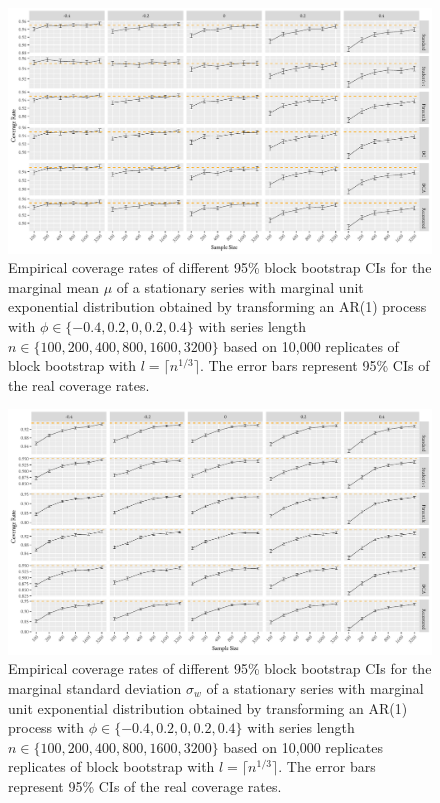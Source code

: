 \documentclass[10pt]{article}
\newcommand{\eds}[1]{\textcolor{red}{EDS: (#1)}}
\newcommand{\mc}[1]{\textcolor{orange}{MC: (#1)}}
\begin{document}
\begin{figure}[tbp]
  \centering
  \includegraphics[width=\textwidth]{figures/plot_exp_mu_1}
  \caption{Empirical coverage rates of different 95\% block bootstrap CIs for
    the marginal mean $\mu$ of a stationary series with marginal unit exponential
    distribution obtained by transforming an AR(1) process with
    $\phi \in \{-0.4, 0.2, 0, 0.2, 0.4\}$ with series length
    $n \in \{100, 200, 400, 800, 1600, 3200\}$ based on 10,000 replicates of
    block bootstrap with $l = \lceil n^{1/3} \rceil$. 
    The error bars represent 95\% CIs of the real coverage rates.}
  \label{fig:exp_mu1}
\end{figure}


\begin{figure}[tbp]
  \centering
  \includegraphics[width=\textwidth]{figures/plot_exp_sigma_1}
  \caption{Empirical coverage rates of different 95\% block bootstrap CIs for
    the marginal standard deviation $\sigma_w$ %
    of a stationary series with 
    marginal unit exponential distribution obtained by transforming an AR(1) process
    with $\phi \in \{-0.4, 0.2, 0, 0.2, 0.4\}$ with series length 
    $n \in \{100, 200, 400, 800, 1600, 3200\}$ based on 10,000 replicates 
    replicates of
    block bootstrap with $l = \lceil n^{1/3} \rceil$. 
    The error bars represent 95\% CIs of the real coverage rates.}
  \label{fig:exp_sigma1}
\end{figure}
\end{document}
